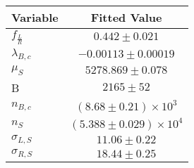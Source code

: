 \begin{tabular}[t]{lc}
\hline
Variable &Fitted Value\\
\hline\hline
$f_{\frac{L}{R}}$&$0.442\pm0.021$\\
\hline
$\lambda_{B,c}$&$-0.00113\pm0.00019$\\
\hline
$\mu_S$&$5278.869\pm0.078$\\
\hline
B&$2165\pm52$\\
\hline
$n_{B,c}$&$(8.68\pm0.21)\times 10^3$\\
\hline
$n_S$&$(5.388\pm0.029)\times 10^4$\\
\hline
$\sigma_{L, S}$&$11.06\pm0.22$\\
\hline
$\sigma_{R, S}$&$18.44\pm0.25$\\
\hline
\end{tabular}